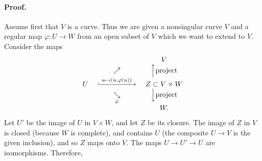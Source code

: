 \paragraph{Proof.}
Assume first that $V$ is a curve. Thus we are given a nonsingular curve $V$
and a regular map $\varphi \colon U \to W$ from an open subset of $V$ which
we want to extend to $V$. Consider the maps
\[
  \begin{array}{ccc}
      &            & V \\
      & \nearrow   & \Big\uparrow \text{project} \\
    U & \;\lhook\joinrel\xrightarrow{\;u \mapsto (u, \varphi(u))\;}\;
        & Z \subset V \times W \\
      & \underset{\varphi}{\searrow}
        & \Big\downarrow \text{project} \\
      &            & W.
  \end{array}
\]
Let $U'$ be the image of $U$ in $V \times W$, and let $Z$ be its closure.
The image of $Z$ in $V$ is closed (because $W$ is complete), and contains
$U$ (the composite $U \to V$ is the given inclusion), and so $Z$ maps onto
$V$. The maps $U \to U' \to U$ are isomorphisms. Therefore,
